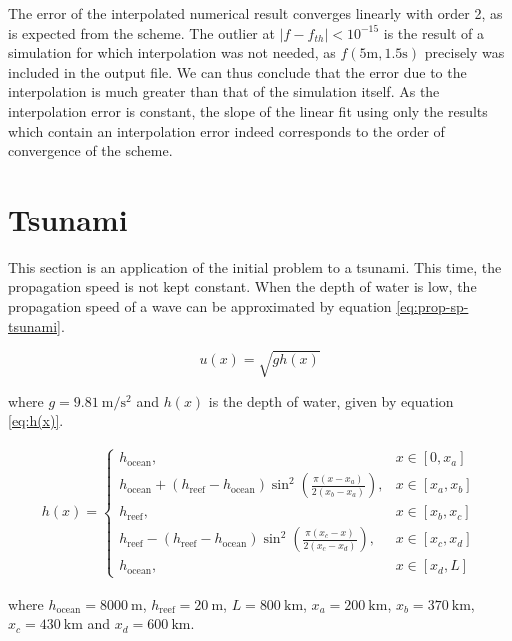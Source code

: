 \documentclass[a4paper,12pt,twoside]{article}
\newcommand{\bracket}[1]{\left(#1\right)}
\newcommand{\sqbracket}[1]{\left[#1\right]}
\begin{document}
    The error of the interpolated numerical result converges linearly with order 2, as is expected from the scheme. The outlier at $|f-f_{th}|<10^{-15}$ is the result of a simulation for which interpolation was not needed, as $f(5 \text{m},1.5\text{s})$ precisely was included in the output file. We can thus conclude that the error due to the interpolation is much greater than that of the simulation itself. As the interpolation error is constant, the slope of the linear fit using only the results which contain an interpolation error indeed corresponds to the order of convergence of the scheme. %
    
    \section{Tsunami}
      This section is an application of the initial problem to a tsunami.
      This time, the propagation speed is not kept constant.
      When the depth of water is low, the propagation speed of a wave can be approximated by equation \eqref{eq:prop-sp-tsunami}.

      \begin{equation}
        u\bracket{x} = \sqrt{gh\bracket{x}}
        \label{eq:prop-sp-tsunami}
      \end{equation}

      where $g=\SI{9.81}{\meter\per\square\second}$ and $h\bracket{x}$ is the depth of water, given by equation \eqref{eq:h(x)}.

      \begin{align}
        h(x)=
        \begin{cases}
          h_\text{ocean}, &x\in\sqbracket{0,x_a} \\
          h_\text{ocean} + \bracket{h_\text{reef} - h_\text{ocean}}\sin^2\bracket{\frac{\pi\bracket{x-x_a}}{2\bracket{x_b-x_a}}}, &x\in\sqbracket{x_a,x_b} \\
          h_\text{reef}, &x\in\sqbracket{x_b,x_c} \\
          h_\text{reef} - \bracket{h_\text{reef} - h_\text{ocean}}\sin^2\bracket{\frac{\pi\bracket{x_c - x}}{2\bracket{x_c-x_d}}}, &x\in\sqbracket{x_c,x_d} \\
          h_\text{ocean}, &x\in\sqbracket{x_d, L}
        \end{cases}
        \label{eq:h(x)}
      \end{align}

      where $h_\text{ocean} = \SI{8000}{\m}$, $h_\text{reef} = \SI{20}{\meter}$, $L=\SI{800}{\kilo\meter}$, $x_a = \SI{200}{\kilo\meter}$, $x_b = \SI{370}{\kilo\meter}$, $x_c=\SI{430}{\kilo\meter}$ and $x_d=\SI{600}{\kilo\meter}$.\\
\end{document}
